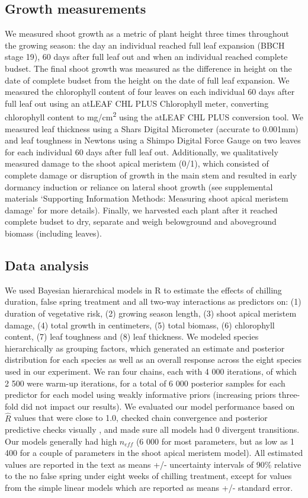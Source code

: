 \documentclass{article}\usepackage[]{graphicx}\usepackage[]{color}
\begin{document}
\begin{enumerate}
\subsection*{Growth measurements}
We measured shoot growth as a metric of plant height three times throughout the growing season: the day an individual reached full leaf expansion (BBCH stage 19), 60 days after full leaf out and when an individual reached complete budset. The final shoot growth was measured as the difference in height on the date of complete budset from the height on the date of full leaf expansion. We measured the chlorophyll content of four leaves on each individual 60 days after full leaf out using an atLEAF CHL PLUS Chlorophyll meter, converting chlorophyll content to mg/cm\textsuperscript{2} using the atLEAF CHL PLUS conversion tool. We measured leaf thickness using a Shars Digital Micrometer (accurate to 0.001mm) and leaf toughness in Newtons using a Shimpo Digital Force Gauge on two leaves for each individual 60 days after full leaf out. Additionally, we qualitatively measured damage to the shoot apical meristem (0/1), which consisted of complete damage or disruption of growth in the main stem and resulted in early dormancy induction or reliance on lateral shoot growth (see supplemental materials `Supporting Information Methods: Measuring shoot apical meristem damage' for more details). Finally, we harvested each plant after it reached complete budset to dry, separate and weigh belowground and aboveground biomass (including leaves). 

\subsection*{Data analysis} 
We used Bayesian hierarchical models \citep[with the brms package,][version 2.3.1]{brms} in R \citep[][version 3.3.1]{R} to estimate the effects of chilling duration, false spring treatment and all two-way interactions as predictors on: (1) duration of vegetative risk, (2) growing season length, (3) shoot apical meristem damage, (4) total growth in centimeters, (5) total biomass, (6) chlorophyll content, (7) leaf toughness and (8) leaf thickness. We modeled species hierarchically as grouping factors, which generated an estimate and posterior distribution for each species as well as an overall response across the eight species used in our experiment. We ran four chains, each with 4 000 iterations, of which 2 500 were warm-up iterations, for a total of 6 000 posterior samples for each predictor for each model using weakly informative priors (increasing priors three-fold did not impact our results). We evaluated our model performance based on $\hat{R}$ values that were close to 1.0, checked chain convergence and posterior predictive checks visually \citep{BDA}, and made sure all models had 0 divergent transitions. Our models generally had high $n_{eff}$ (6 000 for most parameters, but as low as 1 400 for a couple of parameters in the shoot apical meristem model). All estimated values are reported in the text as means +/- uncertainty intervals of 90\% relative to the no false spring under eight weeks of chilling treatment, except for values from the simple linear models which are reported as means +/- standard error. 



\end{enumerate}
\end{document}
